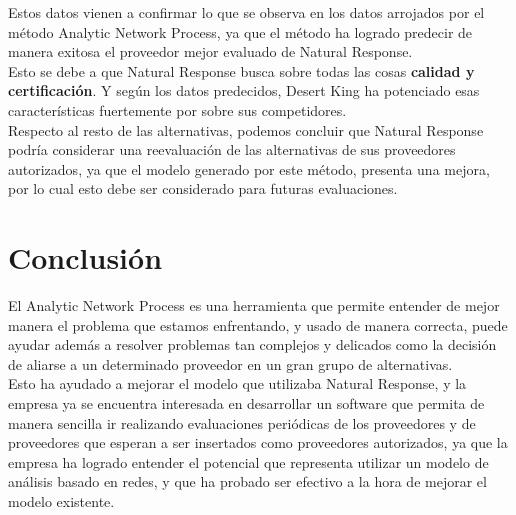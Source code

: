 \documentclass[12pt,letterpaper]{article}
\begin{document}
Estos datos vienen a confirmar lo que se observa en los datos arrojados por el método Analytic Network Process, ya que el método ha logrado predecir de manera exitosa el proveedor mejor evaluado de Natural Response.\\

Esto se debe a que Natural Response busca sobre todas las cosas \textbf{calidad y certificación}. Y según los datos predecidos, Desert King ha potenciado esas características fuertemente por sobre sus competidores.\\
Respecto al resto de las alternativas, podemos concluir que Natural Response podría considerar una reevaluación de las alternativas de sus proveedores autorizados, ya que el modelo generado por este método, presenta una mejora, por lo cual esto debe ser considerado para futuras evaluaciones.

\newpage
\section{Conclusión}
El Analytic Network Process es una herramienta que permite entender de mejor manera el problema que estamos enfrentando, y usado de manera correcta, puede ayudar además a resolver problemas tan complejos y delicados como la decisión de aliarse a un determinado proveedor en un gran grupo de alternativas.\\
Esto ha ayudado a mejorar el modelo que utilizaba Natural Response, y la empresa ya se encuentra interesada en desarrollar un software que permita de manera sencilla ir realizando evaluaciones periódicas de los proveedores y de proveedores que esperan a ser insertados como proveedores autorizados, ya que la empresa ha logrado entender el potencial que representa utilizar un modelo de análisis basado en redes, y que ha probado ser efectivo a la hora de mejorar el modelo existente.
\newpage
\end{document}

